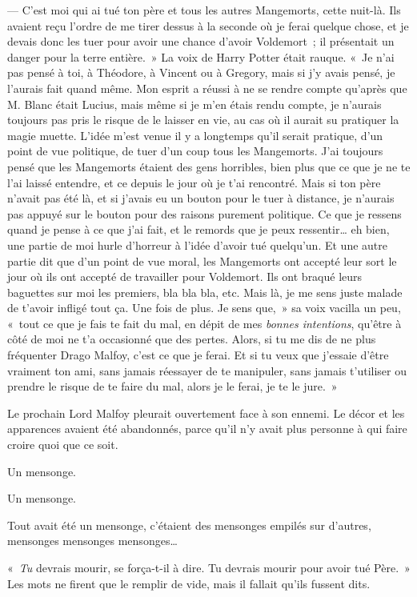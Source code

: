 --- C'est moi qui ai tué ton père et tous les autres Mangemorts, cette nuit-là.
Ils avaient reçu l'ordre de me tirer dessus à la seconde où je ferai quelque chose, et je devais donc les tuer pour avoir une chance d'avoir Voldemort~; il présentait un danger pour la terre entière.~»
La voix de Harry Potter était rauque.
«~Je n'ai pas pensé à toi, à Théodore, à Vincent ou à Gregory, mais si j'y avais pensé, je l'aurais fait quand même.
Mon esprit a réussi à ne se rendre compte qu'après que M. Blanc était Lucius, mais même si je m'en étais rendu compte, je n'aurais toujours pas pris le risque de le laisser en vie, au cas où il aurait su pratiquer la magie muette.
L'idée m'est venue il y a longtemps qu'il serait pratique, d'un point de vue politique, de tuer d'un coup tous les Mangemorts.
J'ai toujours pensé que les Mangemorts étaient des gens horribles, bien plus que ce que je ne te l'ai laissé entendre, et ce depuis le jour où je t'ai rencontré.
Mais si ton père n'avait pas été là, et si j'avais eu un bouton pour le tuer à distance, je n'aurais pas appuyé sur le bouton pour des raisons purement politique.
Ce que je ressens quand je pense à ce que j'ai fait, et le remords que je peux ressentir… eh bien, une partie de moi hurle d'horreur à l'idée d'avoir tué quelqu'un.
Et une autre partie dit que d'un point de vue moral, les Mangemorts ont accepté leur sort le jour où ils ont accepté de travailler pour Voldemort.
Ils ont braqué leurs baguettes sur moi les premiers, bla bla bla, etc.
Mais là, je me sens juste malade de t'avoir infligé tout ça.
Une fois de plus.
Je sens que,~» sa voix vacilla un peu, «~tout ce que je fais te fait du mal, en dépit de mes \emph{bonnes intentions}, qu'être à côté de moi ne t'a occasionné que des pertes.
Alors, si tu me dis de ne plus fréquenter Drago Malfoy, c'est ce que je ferai.
Et si tu veux que j'essaie d'être vraiment ton ami, sans jamais réessayer de te manipuler, sans jamais t'utiliser ou prendre le risque de te faire du mal, alors je le ferai, je te le jure.~»

Le prochain Lord Malfoy pleurait ouvertement face à son ennemi.
Le décor et les apparences avaient été abandonnés, parce qu'il n'y avait plus personne à qui faire croire quoi que ce soit.

Un mensonge.

Un mensonge.

Tout avait été un mensonge, c'étaient des mensonges empilés sur d'autres, mensonges mensonges mensonges…

«~\emph{Tu} devrais mourir, se força-t-il à dire.
Tu devrais mourir pour avoir tué Père.~»
Les mots ne firent que le remplir de vide, mais il fallait qu'ils fussent dits.

